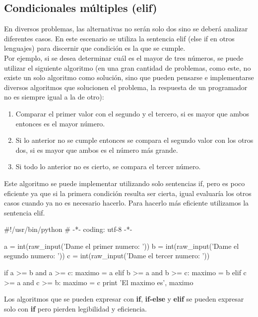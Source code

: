 \subsection{Condicionales múltiples (elif)}

En diversos problemas, las alternativas no serán solo dos sino se deberá analizar diferentes casos. En este escenario se utiliza la sentencia elif (else if en otros lenguajes) para discernir que condición es la que se cumple.\\

Por ejemplo, si se desea determinar cuál es el mayor de tres números, se puede utilizar el siguiente algoritmo (en una gran cantidad de problemas, como este, no existe un solo algoritmo como solución, sino que pueden pensarse e implementarse diversos algoritmos que solucionen el problema, la respuesta de un programador no es siempre igual a la de otro):

\begin{enumerate}
\item Comparar el primer valor con el segundo y el tercero, si es mayor que ambos entonces es el mayor número.
\item Si lo anterior no se cumple entonces se compara el segundo valor con los otros dos, si es mayor que ambos es el número más grande.
\item Si todo lo anterior no es cierto, se compara el tercer número.
\end{enumerate}

Este algoritmo se puede implementar utilizando solo sentencias if, pero es poco eficiente ya que si la primera condición resulta ser cierta, igual evaluaría los otros casos cuando ya no es necesario hacerlo. Para hacerlo más eficiente utilizamos la sentencia elif.\\

\begin{pyglist} [language=python]
#!/usr/bin/python
# -*- coding: utf-8 -*-

a = int(raw_input('Dame el primer numero: '))
b = int(raw_input('Dame el segundo numero: '))
c = int(raw_input('Dame el tercer numero: '))

if a >= b and a >= c:
    maximo = a
elif b >= a and b >= c:
    maximo = b
elif c >= a and c >= b:
    maximo = c
print 'El maximo es', maximo
\end{pyglist}                    

Los algoritmos que se pueden expresar con \textbf{if}, \textbf{if-else} y \textbf{elif} se pueden expresar solo con \textbf{if} pero pierden legibilidad y eficiencia.

